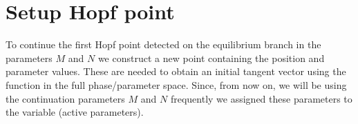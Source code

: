 \documentclass[letterpaper,10pt,english]{jupyterBook}
\begin{document}
\begin{sphinxVerbatim}[commandchars=\\\{\}]
\end{sphinxVerbatim}

\noindent{}


\section{Setup Hopf point}
\label{\detokenize{HomoclinicRGflows:setup-hopf-point}}
\sphinxAtStartPar
To continue the first Hopf point detected on the equilibrium branch 
in the parameters \(M\) and \(N\) we construct a new point  containing the
position and parameter values.  These are needed to obtain an initial tangent
vector \sphinxhyphen{} using the function  \sphinxhyphen{} in the full phase/parameter space.
Since, from now on, we will be using the continuation parameters \(M\) and \(N\)
frequently we assigned these parameters to the variable  (active
parameters).
\end{document}
